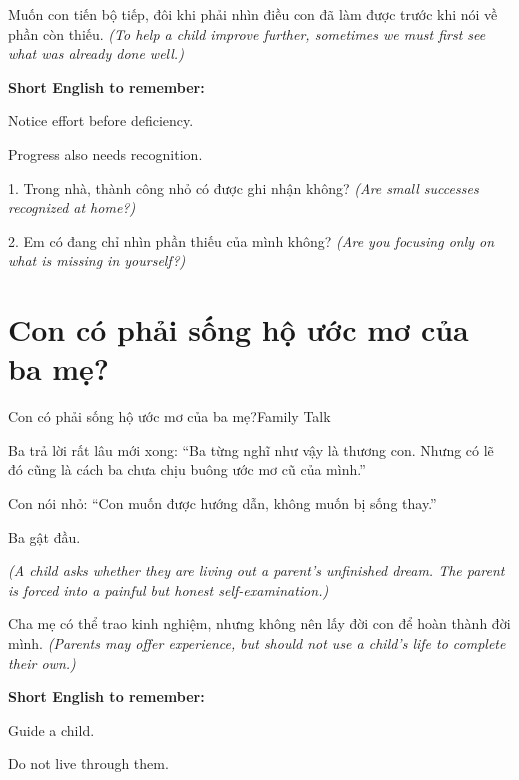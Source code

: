 \begin{baihoc}
Muốn con tiến bộ tiếp, đôi khi phải nhìn điều con đã làm được trước khi nói về phần còn thiếu.
\textit{(To help a child improve further, sometimes we must first see what was already done well.)}
\end{baihoc}

\begin{ghinhoanh}
\textbf{Short English to remember:}

Notice effort before deficiency.

Progress also needs recognition.
\end{ghinhoanh}

\begin{tuhocnhanh}
1. Trong nhà, thành công nhỏ có được ghi nhận không? \textit{(Are small successes recognized at home?)}

2. Em có đang chỉ nhìn phần thiếu của mình không? \textit{(Are you focusing only on what is missing in yourself?)}
\end{tuhocnhanh}
\ngancach

\section{Con có phải sống hộ ước mơ của ba mẹ?}
\begin{truyen}{Con có phải sống hộ ước mơ của ba mẹ?}{Family Talk}

Ba trả lời rất lâu mới xong: ``Ba từng nghĩ như vậy là thương con. Nhưng có lẽ đó cũng là cách ba chưa chịu buông ước mơ cũ của mình.''

Con nói nhỏ: ``Con muốn được hướng dẫn, không muốn bị sống thay.''

Ba gật đầu.

\textit{(A child asks whether they are living out a parent's unfinished dream. The parent is forced into a painful but honest self-examination.)}
\end{truyen}

\begin{baihoc}
Cha mẹ có thể trao kinh nghiệm, nhưng không nên lấy đời con để hoàn thành đời mình.
\textit{(Parents may offer experience, but should not use a child's life to complete their own.)}
\end{baihoc}

\begin{ghinhoanh}
\textbf{Short English to remember:}

Guide a child.

Do not live through them.
\end{ghinhoanh}


